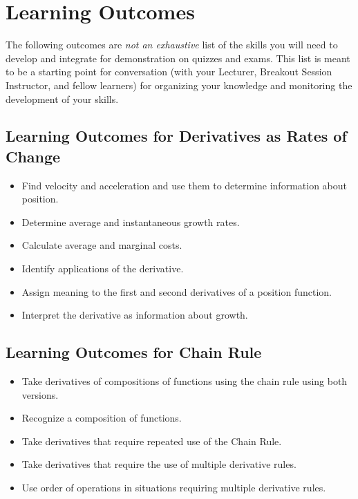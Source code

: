 \documentclass[handout,nooutcomes]{ximera}
\begin{document}
\section{Learning Outcomes}
\label{section:learning-outcomes}
{\small
The following outcomes are \emph{not an exhaustive} list of the skills you will need to develop and integrate for demonstration on quizzes and exams.
This list is meant to be a starting point for conversation (with your Lecturer, Breakout Session Instructor, and fellow learners) for organizing your knowledge and monitoring the development of your skills.

\subsection*{Learning Outcomes for Derivatives as Rates of Change}
\begin{itemize}
  \item
    Find velocity and acceleration and use them to determine information about position.

  \item 
    Determine average and instantaneous growth rates. 

  \item 
    Calculate average and marginal costs. 

  \item 
    Identify applications of the derivative.

  \item 
    Assign meaning to the first and second derivatives of a position function.

  \item 
    Interpret the derivative as information about growth. 
\end{itemize}

\subsection*{Learning Outcomes for Chain Rule}
\begin{itemize}
  \item
    Take derivatives of compositions of functions using the chain rule using both versions. 

  \item
    Recognize a composition of functions.

  \item 
    Take derivatives that require repeated use of the Chain Rule.

  \item
    Take derivatives that require the use of multiple derivative rules.

  \item 
    Use order of operations in situations requiring multiple derivative rules.
\end{itemize}}
\end{document}
